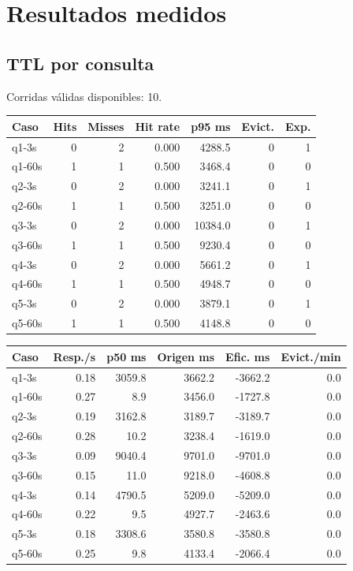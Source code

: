 \documentclass[11pt]{article}
\begin{document}
\section{Resultados medidos}
\subsection{TTL por consulta}
Corridas válidas disponibles: 10.\par
{\small\begin{longtable}{lrrrrrr}\toprule Caso & Hits & Misses & Hit rate & p95 ms & Evict. & Exp.\\\midrule\endhead
q1-3s & 0 & 2 & 0.000 & 4288.5 & 0 & 1 \\
q1-60s & 1 & 1 & 0.500 & 3468.4 & 0 & 0 \\
q2-3s & 0 & 2 & 0.000 & 3241.1 & 0 & 1 \\
q2-60s & 1 & 1 & 0.500 & 3251.0 & 0 & 0 \\
q3-3s & 0 & 2 & 0.000 & 10384.0 & 0 & 1 \\
q3-60s & 1 & 1 & 0.500 & 9230.4 & 0 & 0 \\
q4-3s & 0 & 2 & 0.000 & 5661.2 & 0 & 1 \\
q4-60s & 1 & 1 & 0.500 & 4948.7 & 0 & 0 \\
q5-3s & 0 & 2 & 0.000 & 3879.1 & 0 & 1 \\
q5-60s & 1 & 1 & 0.500 & 4148.8 & 0 & 0 \\
\bottomrule\end{longtable}}
{\small\begin{longtable}{lrrrrr}\toprule Caso & Resp./s & p50 ms & Origen ms & Efic. ms & Evict./min\\\midrule\endhead
q1-3s & 0.18 & 3059.8 & 3662.2 & -3662.2 & 0.0 \\
q1-60s & 0.27 & 8.9 & 3456.0 & -1727.8 & 0.0 \\
q2-3s & 0.19 & 3162.8 & 3189.7 & -3189.7 & 0.0 \\
q2-60s & 0.28 & 10.2 & 3238.4 & -1619.0 & 0.0 \\
q3-3s & 0.09 & 9040.4 & 9701.0 & -9701.0 & 0.0 \\
q3-60s & 0.15 & 11.0 & 9218.0 & -4608.8 & 0.0 \\
q4-3s & 0.14 & 4790.5 & 5209.0 & -5209.0 & 0.0 \\
q4-60s & 0.22 & 9.5 & 4927.7 & -2463.6 & 0.0 \\
q5-3s & 0.18 & 3308.6 & 3580.8 & -3580.8 & 0.0 \\
q5-60s & 0.25 & 9.8 & 4133.4 & -2066.4 & 0.0 \\
\bottomrule\end{longtable}}
\end{document}
